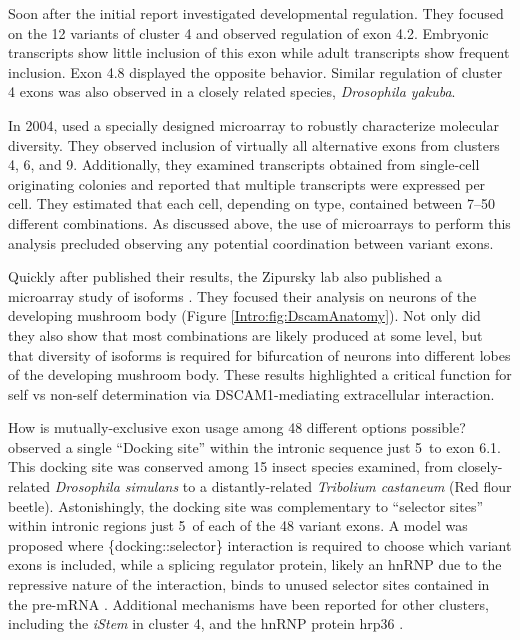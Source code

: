     Soon after the initial \dscam{} report \citet{Celotto2001} investigated \dscam{} developmental regulation. They focused on the 12 variants of cluster 4 and observed regulation of exon 4.2. Embryonic transcripts show little inclusion of this exon while adult transcripts show frequent inclusion. Exon 4.8 displayed the opposite behavior. Similar regulation of cluster 4 exons was also observed in a closely related species, \textit{Drosophila yakuba}.

    In 2004, \citet{Neves2004} used a specially designed microarray to robustly characterize \dscam{} molecular diversity. They observed inclusion of virtually all alternative exons from clusters 4, 6, and 9. Additionally, they examined \dscam{} transcripts obtained from single-cell originating colonies and reported that multiple \dscam{} transcripts were expressed per cell. They estimated that each cell, depending on type, contained between 7--50 different combinations. As discussed above, the use of microarrays to perform this analysis precluded observing any potential coordination between variant exons.

    Quickly after \citet{Neves2004} published their results, the Zipursky lab also published a microarray study of \dscam{} isoforms \citep{Zhan2004}. They focused their analysis on neurons of the developing mushroom body (Figure \ref{Intro:fig:DscamAnatomy}). Not only did they also show that most \dscam{} combinations are likely produced at some level, but that diversity of isoforms is required for bifurcation of neurons into different lobes of the developing mushroom body. These results highlighted a critical function for self vs non-self determination via DSCAM1-mediating extracellular interaction.

    How is mutually-exclusive exon usage among 48 different options possible? \citet{Graveley2005b} observed a single ``Docking site'' within the intronic sequence just 5\textprime~to exon 6.1. This docking site was conserved among 15 insect species examined, from closely-related \textit{Drosophila simulans} to a distantly-related \textit{Tribolium castaneum} (Red flour beetle). Astonishingly, the docking site was complementary to ``selector sites'' within intronic regions just 5\textprime~of each of the 48 variant exons. A model was proposed where \{docking::selector\} interaction is required to choose which variant exons is included, while a splicing regulator protein, likely an hnRNP due to the repressive nature of the interaction, binds to unused selector sites contained in the pre-mRNA \citep{Graveley2000}. Additional mechanisms have been reported for other clusters, including the \textit{iStem} \citep{Kreahling2005} in cluster 4, and the hnRNP protein hrp36 \citep{Olson2007}.


